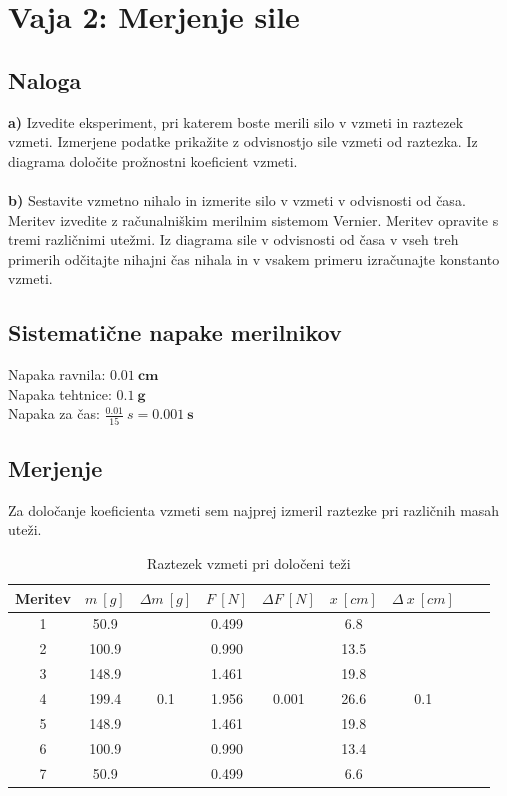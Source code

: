 \documentclass{report}
\begin{document}
\chapter{Vaja 2: Merjenje sile}

\section{Naloga}

\textbf{a)} Izvedite eksperiment, pri katerem boste merili silo v vzmeti in raztezek vzmeti. 
Izmerjene podatke prikažite z odvisnostjo sile vzmeti od raztezka. 
Iz diagrama določite prožnostni koeficient vzmeti.
\\\\
\textbf{b)} Sestavite vzmetno nihalo in izmerite silo v vzmeti v odvisnosti od časa. 
Meritev izvedite z računalniškim merilnim sistemom Vernier. 
Meritev opravite s tremi različnimi utežmi. 
Iz diagrama sile v odvisnosti od časa v vseh treh primerih odčitajte nihajni čas nihala in v vsakem primeru izračunajte konstanto vzmeti.

\section{Sistematične napake merilnikov}

Napaka ravnila: $\bm{0.01 \ cm}$ \\
Napaka tehtnice: $\bm{0.1 \ g}$ \\
Napaka za čas: $\frac{0.01}{15} \ s = \bm{0.001 \ s}$

\pagebreak

\section{Merjenje}

Za določanje koeficienta vzmeti sem najprej izmeril raztezke pri različnih masah uteži.

\begin{table}[H]
  \centering
  \caption{Raztezek vzmeti pri določeni teži}
  \begin{adjustwidth}{0cm}{0cm}
  \begin{tabular}{ccccccccc}
  \toprule
  Meritev & $m \ [g]$ & $\Delta m \ [g]$ & $ F \ [N] $ & $\Delta F \ [N]$ & $ x \ [cm] $ & $\Delta \ x \ [cm]$  \\
  \midrule
  1 & 50.9 & \multirow{7}{*}{0.1} & 0.499 & \multirow{7}{*}{0.001} & 6.8 & \multirow{7}{*}{0.1} & \\
  2 & 100.9 &  & 0.990 & & 13.5 & \\
  3 & 148.9 &  & 1.461 & & 19.8 &  \\
  4 & 199.4 &  & 1.956 & & 26.6 & \\
  5 & 148.9 &  & 1.461 & & 19.8 & \\
  6 & 100.9 &  & 0.990 & & 13.4 & \\
  7 & 50.9 &  & 0.499 & & 6.6 & \\
  \bottomrule
  \end{tabular}
  \end{adjustwidth}
\end{table}
\end{document}
